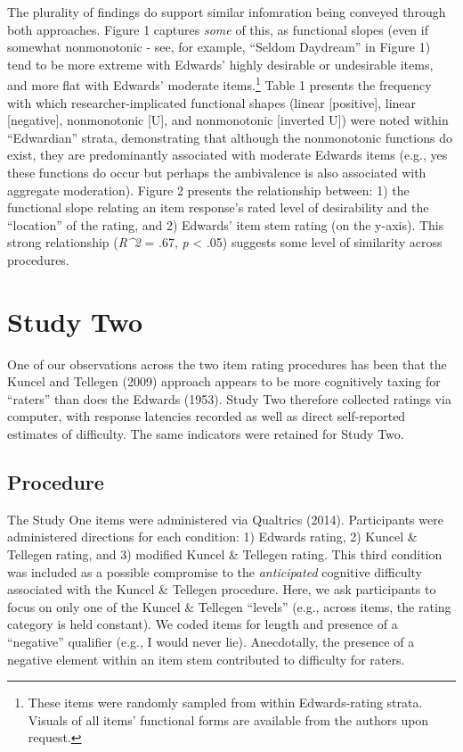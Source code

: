 \documentclass[
  english,
  ,jou]{apa6}
\begin{document}
The plurality of findings do support similar infomration being conveyed through both approaches. Figure 1 captures \emph{some} of this, as functional slopes (even if somewhat nonmonotonic - see, for example, \enquote{Seldom Daydream} in Figure 1) tend to be more extreme with Edwards' highly desirable or undesirable items, and more flat with Edwards' moderate items.\footnote{These items were randomly sampled from within Edwards-rating strata. Visuals of all items' functional forms are available from the authors upon request.} Table 1 presents the frequency with which researcher-implicated functional shapes (linear {[}positive{]}, linear {[}negative{]}, nonmonotonic {[}U{]}, and nonmonotonic {[}inverted U{]}) were noted within \enquote{Edwardian} strata, demonstrating that although the nonmonotonic functions do exist, they are predominantly associated with moderate Edwards items (e.g., yes these functions do occur but perhaps the ambivalence is also associated with aggregate moderation). Figure 2 presents the relationship between: 1) the functional slope relating an item response's rated level of desirability and the \enquote{location} of the rating, and 2) Edwards' item stem rating (on the y-axis). This strong relationship (\emph{R\^{}2} = .67, \emph{p} \textless{} .05) suggests some level of similarity across procedures.

\hypertarget{study-two}{%
\section{Study Two}\label{study-two}}

One of our observations across the two item rating procedures has been that the Kuncel and Tellegen (2009) approach appears to be more cognitively taxing for \enquote{raters} than does the Edwards (1953). Study Two therefore collected ratings via computer, with response latencies recorded as well as direct self-reported estimates of difficulty. The same indicators were retained for Study Two.

\hypertarget{procedure-1}{%
\subsection{Procedure}\label{procedure-1}}

The Study One items were administered via Qualtrics (2014). Participants were administered directions for each condition: 1) Edwards rating, 2) Kuncel \& Tellegen rating, and 3) modified Kuncel \& Tellegen rating. This third condition was included as a possible compromise to the \emph{anticipated} cognitive difficulty associated with the Kuncel \& Tellegen procedure. Here, we ask participants to focus on only one of the Kuncel \& Tellegen \enquote{levels} (e.g., across items, the rating category is held constant). We coded items for length and presence of a \enquote{negative} qualifier (e.g., I would never lie). Anecdotally, the presence of a negative element within an item stem contributed to difficulty for raters.
\end{document}
